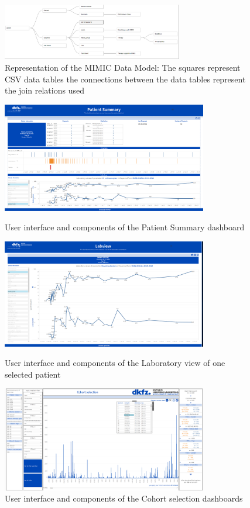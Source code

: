 \documentclass[aac,crcready]{iosart2x}
\begin{document}
\begin{figure}[ht]
\includegraphics[width=0.7\textwidth]{images/datamodel_1.png}
\caption{Representation of the MIMIC Data Model: The squares represent CSV data tables the connections between the data tables represent the join relations used}\label{f1}
\end{figure}

\begin{figure}[HT]
\centering
\includegraphics[width=0.8\textwidth]{images/Pat sum.png}
\caption{User interface and components of the Patient Summary dashboard}\label{f2}
\includegraphics[width=0.8\textwidth]{images/Labview.png}
\caption{User interface and components of the Laboratory view of one selected patient}\label{f3}
\includegraphics[width=0.8\textwidth]{images/ch sel.png}
\caption{User interface and components of the Cohort selection dashboards}\label{f4}
\end{figure}
\end{document}
